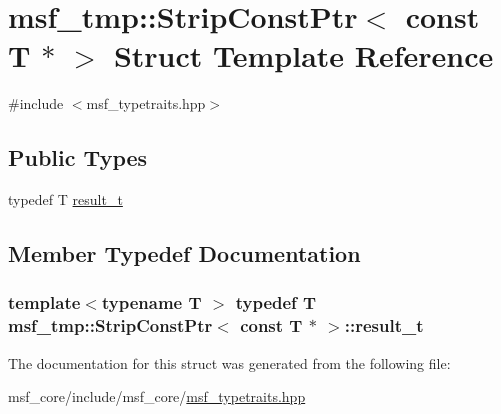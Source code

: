 \hypertarget{structmsf__tmp_1_1StripConstPtr_3_01const_01T_01_5_01_4}{\section{msf\-\_\-tmp\-:\-:Strip\-Const\-Ptr$<$ const T $\ast$ $>$ Struct Template Reference}
\label{structmsf__tmp_1_1StripConstPtr_3_01const_01T_01_5_01_4}
}


{\ttfamily \#include $<$msf\-\_\-typetraits.\-hpp$>$}

\subsection*{Public Types}
\begin{DoxyCompactItemize}
\item 
typedef T \hyperlink{structmsf__tmp_1_1StripConstPtr_3_01const_01T_01_5_01_4_abd775b4e0a2c4592dbbb4c7cc6910535}{result\-\_\-t}
\end{DoxyCompactItemize}


\subsection{Member Typedef Documentation}
\hypertarget{structmsf__tmp_1_1StripConstPtr_3_01const_01T_01_5_01_4_abd775b4e0a2c4592dbbb4c7cc6910535}{
\subsubsection[{result\-\_\-t}]{\setlength{\rightskip}{0pt plus 5cm}template$<$typename T $>$ typedef T {\bf msf\-\_\-tmp\-::\-Strip\-Const\-Ptr}$<$ const T $\ast$ $>$\-::{\bf result\-\_\-t}}}\label{structmsf__tmp_1_1StripConstPtr_3_01const_01T_01_5_01_4_abd775b4e0a2c4592dbbb4c7cc6910535}


The documentation for this struct was generated from the following file\-:\begin{DoxyCompactItemize}
\item 
msf\-\_\-core/include/msf\-\_\-core/\hyperlink{msf__typetraits_8hpp}{msf\-\_\-typetraits.\-hpp}\end{DoxyCompactItemize}
